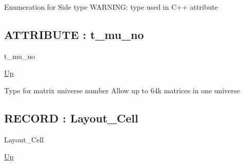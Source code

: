 \par
Enumeration for Side type WARNING: type used in C++ attribute
\par
\subsection*{ATTRIBUTE : t\_mu\_no}
\hypertarget{ecldoc:pbblas.types.t_mu_no}{}
\begin{minipage}[t]{\textwidth}
\begin{flushleft}
 t\_mu\_no 
\end{flushleft}
\end{minipage}
\hyperlink{ecldoc:PBblas.Types}{Up}

\par
Type for matrix universe number Allow up to 64k matrices in one universe
\par
\subsection*{RECORD : Layout\_Cell}
\hypertarget{ecldoc:pbblas.types.layout_cell}{}
\begin{minipage}[t]{\textwidth}
\begin{flushleft}
 Layout\_Cell 
\end{flushleft}
\end{minipage}
\hyperlink{ecldoc:PBblas.Types}{Up}

